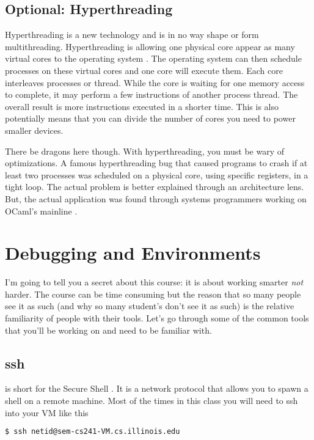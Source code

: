 \subsection{Optional: Hyperthreading}

Hyperthreading is a new technology and is in no way shape or form multithreading.
Hyperthreading is allowing one physical core appear as many virtual cores to the operating system \cite[P.51]{guide2011intel}.
The operating system can then schedule processes on these virtual cores and one core will execute them.
Each core interleaves processes or thread.
While the core is waiting for one memory access to complete, it may perform a few instructions of another process thread.
The overall result is more instructions executed in a shorter time.
This is also potentially means that you can divide the number of cores you need to power smaller devices.

There be dragons here though.
With hyperthreading, you must be wary of optimizations.
A famous hyperthreading bug that caused programs to crash if at least two processes was scheduled on a physical core, using specific registers, in a tight loop.
The actual problem is better explained through an architecture lens.
But, the actual application was found through systems programmers working on OCaml's mainline \cite{leroy_2017}.

\section{Debugging and Environments}

I'm going to tell you a secret about this course: it is about working smarter \textit{not} harder.
The course can be time consuming but the reason that so many people see it as such (and why so many student's don't see it as such) is the relative familiarity of people with their tools.
Let's go through some of the common tools that you'll be working on and need to be familiar with.

\subsection{ssh}

 is short for the Secure Shell \cite{openbsd_ssh}.
It is a network protocol that allows you to spawn a shell on a remote machine.
Most of the times in this class you will need to ssh into your VM like this

\begin{lstlisting}[language=bash]
$ ssh netid@sem-cs241-VM.cs.illinois.edu
\end{lstlisting}

